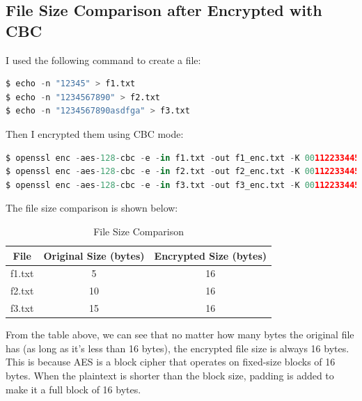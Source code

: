 \documentclass{article}
\begin{document}
\subsection{File Size Comparison after Encrypted with CBC}
I used the following command to create a file:
\begin{lstlisting}[language=Python]
$ echo -n "12345" > f1.txt
$ echo -n "1234567890" > f2.txt
$ echo -n "1234567890asdfga" > f3.txt
\end{lstlisting}
Then I encrypted them using CBC mode:
\begin{lstlisting}[language=Python]
$ openssl enc -aes-128-cbc -e -in f1.txt -out f1_enc.txt -K 00112233445566778889aabbccddeeff -iv 0102030405060708090a0b0c0d0e0f10
$ openssl enc -aes-128-cbc -e -in f2.txt -out f2_enc.txt -K 00112233445566778889aabbccddeeff -iv 0102030405060708090a0b0c0d0e0f10
$ openssl enc -aes-128-cbc -e -in f3.txt -out f3_enc.txt -K 00112233445566778889aabbccddeeff -iv 0102030405060708090a0b0c0d0e0f10
\end{lstlisting}
The file size comparison is shown below:
\begin{table}[h]
\centering
\begin{tabular}{|c|c|c|}
\hline
\textbf{File} & \textbf{Original Size (bytes)} & \textbf{Encrypted Size (bytes)} \\
\hline
f1.txt & 5 & 16 \\
\hline
f2.txt & 10 & 16 \\
\hline
f3.txt & 15 & 16 \\
\hline
\end{tabular}
\caption{File Size Comparison}
\end{table}
From the table above, we can see that no matter how many bytes the original file has (as long as it's less than 16 bytes),
the encrypted file size is always 16 bytes. This is because AES is a block cipher that operates on fixed-size blocks of 16 bytes.
When the plaintext is shorter than the block size, padding is added to make it a full block of 16 bytes.
\end{document}
